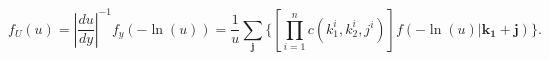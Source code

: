 \documentclass[12pt, draftclsnofoot, onecolumn]{IEEEtran}
\begin{document}
\begin{spacing}{2}
\begin{equation}
f_{U}(u)=|\frac{du}{dy}|^{-1}f_{y}(-\ln(u))=\frac{1}{u}\sum_{\mathbf{j}}\{[\prod_{i=1}^{n}c(k_{1}^{i},k_{2}^{i},j^{i})]f(-\ln(u)|\mathbf{k_{1}}+\mathbf{j})\}.
\label{Appendequal19}
\end{equation}





\ifCLASSOPTIONcaptionsoff
  \newpage
\fi





%
%
%



% 


\end{spacing}
\end{document}

